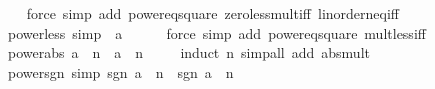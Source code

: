 \begin{isabellebody}
%
\isadelimproof
\ \ %
\endisadelimproof
%
\isatagproof
{}\isamarkupfalse%
\ {\isacharparenleft}{\kern0pt}force\ simp\ add{\isacharcolon}{\kern0pt}\ power{}{\isacharunderscore}{\kern0pt}eq{\isacharunderscore}{\kern0pt}square\ zero{\isacharunderscore}{\kern0pt}less{\isacharunderscore}{\kern0pt}mult{\isacharunderscore}{\kern0pt}iff\ linorder{\isacharunderscore}{\kern0pt}neq{\isacharunderscore}{\kern0pt}iff{\isacharparenright}{\kern0pt}%
\endisatagproof
{\isafoldproof}%
%
\isadelimproof
\isanewline
%
\endisadelimproof
\isanewline
{}\isamarkupfalse%
\ power{}{\isacharunderscore}{\kern0pt}less{\isacharunderscore}{\kern0pt}{}\ {\isacharbrackleft}{\kern0pt}simp{\isacharbrackright}{\kern0pt}{\isacharcolon}{\kern0pt}\ {\isachardoublequoteopen}{\isasymnot}\ a\ {\isacharless}{\kern0pt}\ {}{\isachardoublequoteclose}\isanewline
%
\isadelimproof
\ \ %
\endisadelimproof
%
\isatagproof
{}\isamarkupfalse%
\ {\isacharparenleft}{\kern0pt}force\ simp\ add{\isacharcolon}{\kern0pt}\ power{}{\isacharunderscore}{\kern0pt}eq{\isacharunderscore}{\kern0pt}square\ mult{\isacharunderscore}{\kern0pt}less{\isacharunderscore}{\kern0pt}{}{\isacharunderscore}{\kern0pt}iff{\isacharparenright}{\kern0pt}%
\endisatagproof
{\isafoldproof}%
%
\isadelimproof
\isanewline
%
\endisadelimproof
\isanewline
{}\isamarkupfalse%
\ power{\isacharunderscore}{\kern0pt}abs{\isacharcolon}{\kern0pt}\ {\isachardoublequoteopen}{\isasymbar}a\ {\isacharcircum}{\kern0pt}\ n{\isasymbar}\ {\isacharequal}{\kern0pt}\ {\isasymbar}a{\isasymbar}\ {\isacharcircum}{\kern0pt}\ n{\isachardoublequoteclose}\ %
\isanewline
%
\isadelimproof
\ \ %
\endisadelimproof
%
\isatagproof
{}\isamarkupfalse%
\ {\isacharparenleft}{\kern0pt}induct\ n{\isacharparenright}{\kern0pt}\ {\isacharparenleft}{\kern0pt}simp{\isacharunderscore}{\kern0pt}all\ add{\isacharcolon}{\kern0pt}\ abs{\isacharunderscore}{\kern0pt}mult{\isacharparenright}{\kern0pt}%
\endisatagproof
{\isafoldproof}%
%
\isadelimproof
\isanewline
%
\endisadelimproof
\isanewline
{}\isamarkupfalse%
\ power{\isacharunderscore}{\kern0pt}sgn\ {\isacharbrackleft}{\kern0pt}simp{\isacharbrackright}{\kern0pt}{\isacharcolon}{\kern0pt}\ {\isachardoublequoteopen}sgn\ {\isacharparenleft}{\kern0pt}a\ {\isacharcircum}{\kern0pt}\ n{\isacharparenright}{\kern0pt}\ {\isacharequal}{\kern0pt}\ sgn\ a\ {\isacharcircum}{\kern0pt}\ n{\isachardoublequoteclose}\isanewline
%
\isadelimproof
\ \ %
\endisadelimproof

\end{isabellebody}
